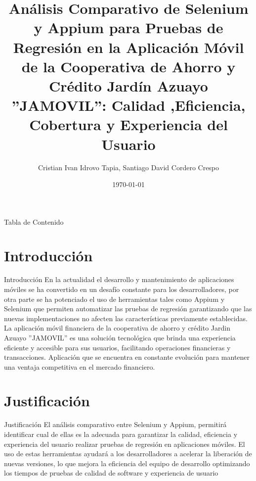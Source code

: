 \documentclass{beamer}
\begin{document}
\title{Análisis Comparativo de Selenium y Appium para Pruebas de Regresión en la Aplicación Móvil  de la Cooperativa de Ahorro y Crédito Jardín Azuayo  ”JAMOVIL”: Calidad ,Eficiencia, Cobertura y Experiencia del Usuario}
\author{Cristian Ivan Idrovo Tapia, Santiago David Cordero Crespo} 
\date{\today}

\begin{frame}
  \titlepage
\end{frame}



\begin{frame}{Tabla de Contenido}
  \tableofcontents
\end{frame}

\section{Introducción}


\begin{frame}{Introducción}
\justify
En la actualidad el desarrollo y mantenimiento de aplicaciones móviles se ha convertido en un desafío constante para los desarrolladores, por otra parte se ha potenciado el uso de herramientas tales como Appium y Selenium que permiten automatizar las pruebas de regresión garantizando que las nuevas implementaciones no afecten las características previamente establecidas.
\newline
\newline
La aplicación móvil financiera de la cooperativa de ahorro y crédito Jardin Azuayo ”JAMOVIL” es una solución tecnológica que brinda una experiencia eficiente y accesible para sus usuarios, facilitando operaciones financieras y transacciones. Aplicación que se encuentra en constante evolución para mantener una ventaja competitiva en el mercado financiero.

\end{frame}


\section{Justificación}

\begin{frame}{Justificación}
\justify
El análisis comparativo entre Selenium y Appium, permitirá identificar cual de ellas es la adecuada para garantizar la calidad, eficiencia y experiencia del usuario realizar pruebas de regresión en aplicaciones móviles.\newline
\newline
El uso de estas herramientas ayudará a los desarrolladores a acelerar la liberación de nuevas versiones, lo que mejora la eficiencia del equipo de desarrollo optimizando los tiempos de pruebas de calidad de software y experiencia de usuario
\end{frame}
\end{document}
